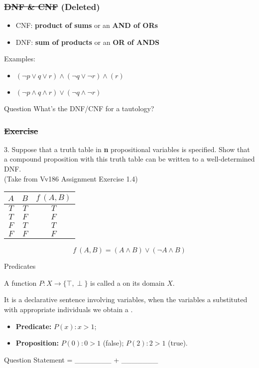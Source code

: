 \documentclass[xcolor=table]{beamer}
\begin{document}
\begin{frame}
    \frametitle{\sout{DNF \& CNF} (Deleted)}
    \begin{itemize}
        \item  CNF: \textbf{product of sums} or an \textbf{AND of ORs}
        \item  DNF: \textbf{sum of products} or an \textbf{OR of ANDS}
    \end{itemize}
    \textcolor[rgb]{0.95,0.75,0.95}{Examples:}
    \begin{itemize}
        \item $(\neg p \vee  q \vee r) \wedge (\neg q \vee \neg r) \wedge (r)$
        \item $(\neg p \wedge q \wedge r) \vee (\neg q \wedge \neg r) $        
    \end{itemize}
    \begin{block}{Question}
        What's the DNF/CNF for a tautology?
    \end{block}
\end{frame}
\begin{frame}
    \frametitle{\sout{Exercise}}
    3. Suppose that a truth table in \textbf{n} propositional variables 
    is speciﬁed. Show that a compound proposition with 
    this truth table can be written to a well-determined DNF. \\(Take from Vv186 Assignment Exercise 1.4)
    \begin{table}[H]
        \begin{tabular}{ccc}
        $A$& $B$ &$f~(A,B)$  \\
        \toprule
        $T$ &$T$  & $T$ \\
        $T$ &$F$  & $F$ \\
        $F$ &$T$  & $T$ \\
        $F$ &$F$  & $F$ \\
        \bottomrule
        \end{tabular}
    \end{table}
    \vv
    $$f~(A,B)=(A \wedge B)\vee (\neg A \wedge B)$$
\end{frame}
\begin{frame}{Predicates}
    \par A function $P: X \to \{\top, \perp \}$ is called a  on its domain $X$. 
    \\\vv
    \par It is a declarative sentence involving variables, when the variables a substituted with appropriate individuals we obtain a .
    \\\vv
    \begin{itemize}
        \item \textbf{Predicate:} $P(x): x>1$;
        \item \textbf{Proposition:} $P(0): 0>1$ (false); $P(2): 2>1$ (true).
    \end{itemize}

    \vv 
    \begin{block}{Question}
        \hh
        Statement = \_\_\_\_\_\_\_ + \_\_\_\_\_\_\_ 
    \end{block}
\end{frame}
\end{document}
